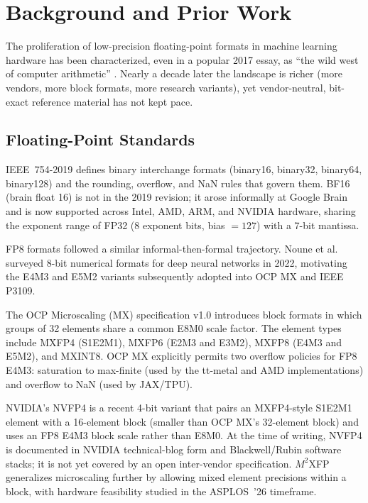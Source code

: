 \documentclass[11pt,letterpaper]{article}
\begin{document}
\section{Background and Prior Work}
\label{sec:background}

The proliferation of low-precision floating-point formats in machine learning
hardware has been characterized, even in a popular 2017 essay, as ``the wild
west of computer arithmetic'' \cite{higham_wildwest}.  Nearly a decade later
the landscape is richer (more vendors, more block formats, more research
variants), yet vendor-neutral, bit-exact reference material has not kept pace.

\subsection{Floating-Point Standards}

IEEE~754-2019 \cite{ieee754} defines binary interchange formats (binary16,
binary32, binary64, binary128) and the rounding, overflow, and NaN rules that
govern them.  BF16 (brain float 16) is not in the 2019 revision; it arose
informally at Google Brain and is now supported across Intel, AMD, ARM, and
NVIDIA hardware, sharing the exponent range of FP32 (8 exponent bits, bias
$= 127$) with a 7-bit mantissa.

FP8 formats followed a similar informal-then-formal trajectory.  Noune et
al.\ \cite{noune_fp8} surveyed 8-bit numerical formats for deep neural networks
in 2022, motivating the E4M3 and E5M2 variants subsequently adopted into OCP MX
and IEEE P3109.

The OCP Microscaling (MX) specification v1.0 \cite{ocp_mx} introduces block
formats in which groups of 32 elements share a common E8M0 scale factor.
The element types include MXFP4 (S1E2M1), MXFP6 (E2M3 and E3M2), MXFP8 (E4M3
and E5M2), and MXINT8.  OCP MX explicitly permits two overflow policies for
FP8 E4M3: saturation to max-finite (used by the tt-metal and AMD implementations)
and overflow to NaN (used by JAX/TPU).

NVIDIA's NVFP4 \cite{nvfp4} is a recent 4-bit variant that pairs an MXFP4-style
S1E2M1 element with a 16-element block (smaller than OCP MX's 32-element block)
and uses an FP8 E4M3 block scale rather than E8M0.  At the time of writing,
NVFP4 is documented in NVIDIA technical-blog form and Blackwell/Rubin software
stacks; it is not yet covered by an open inter-vendor specification.
$M^{2}$XFP \cite{m2xfp} generalizes microscaling further by allowing mixed
element precisions within a block, with hardware feasibility studied in the
ASPLOS~'26 timeframe.
\end{document}
